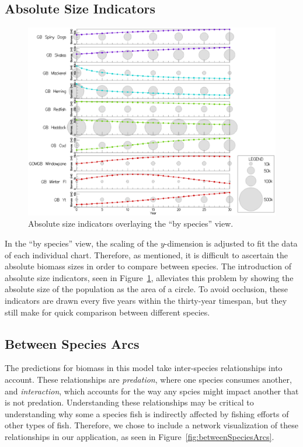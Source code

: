 \subsection{Absolute Size Indicators}

\begin{figure}[h]
	\centering
	\includegraphics[width=12cm]{figures/eps/msprod_abssize.eps}
	\caption{Absolute size indicators overlaying the ``by species'' view.}
	\label{fig:msprod_abssize}
\end{figure}

In the ``by species'' view, the scaling of the $y$-dimension is adjusted to fit the data of each individual chart.  Therefore, as mentioned, it is difficult to ascertain the absolute biomass sizes in order to compare between species.  The introduction of absolute size indicators, seen in Figure~\ref{fig:msprod_abssize}, alleviates this problem by showing the absolute size of the population as the area of a circle.  To avoid occlusion, these indicators are drawn every five years within the thirty-year timespan, but they still make for quick comparison between different species.

\subsection{Between Species Arcs} 
\label{sec:betweenSpeciesArcs}

The predictions for biomass in this model take inter-species relationships into account.  These relationships are \textit{predation}, where one species consumes another, and \textit{interaction}, which accounts for the way any spcies might impact another that is not predation.  Understanding these relationships may be critical to understanding why some a species fish is indirectly affected by fishing efforts of other types of fish.  Therefore, we chose to include a network visualization of these relationships in our application, as seen in Figure~\ref{fig:betweenSpeciesArcs}.

